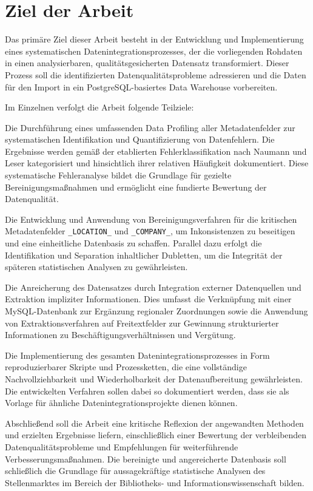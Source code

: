 \documentclass[
    a4paper,
    12pt,
    headinclude=true,
    BCOR=10mm,
]{scrreprt}
\begin{document}
\section{Ziel der Arbeit}

Das primäre Ziel dieser Arbeit besteht in der Entwicklung und Implementierung eines systematischen Datenintegrationsprozesses, der die vorliegenden Rohdaten in einen analysierbaren, qualitätsgesicherten Datensatz transformiert. Dieser Prozess soll die identifizierten Datenqualitätsprobleme adressieren und die Daten für den Import in ein PostgreSQL-basiertes Data Warehouse vorbereiten.

Im Einzelnen verfolgt die Arbeit folgende Teilziele:

Die Durchführung eines umfassenden Data Profiling aller Metadatenfelder zur systematischen Identifikation und Quantifizierung von Datenfehlern. Die Ergebnisse werden gemäß der etablierten Fehlerklassifikation nach Naumann und Leser kategorisiert und hinsichtlich ihrer relativen Häufigkeit dokumentiert. Diese systematische Fehleranalyse bildet die Grundlage für gezielte Bereinigungsmaßnahmen und ermöglicht eine fundierte Bewertung der Datenqualität.

Die Entwicklung und Anwendung von Bereinigungsverfahren für die kritischen Metadatenfelder \texttt{\_LOCATION\_} und \texttt{\_COMPANY\_}, um Inkonsistenzen zu beseitigen und eine einheitliche Datenbasis zu schaffen. Parallel dazu erfolgt die Identifikation und Separation inhaltlicher Dubletten, um die Integrität der späteren statistischen Analysen zu gewährleisten.

Die Anreicherung des Datensatzes durch Integration externer Datenquellen und Extraktion impliziter Informationen. Dies umfasst die Verknüpfung mit einer MySQL-Datenbank zur Ergänzung regionaler Zuordnungen sowie die Anwendung von Extraktionsverfahren auf Freitextfelder zur Gewinnung strukturierter Informationen zu Beschäftigungsverhältnissen und Vergütung.

Die Implementierung des gesamten Datenintegrationsprozesses in Form reproduzierbarer Skripte und Prozessketten, die eine vollständige Nachvollziehbarkeit und Wiederholbarkeit der Datenaufbereitung gewährleisten. Die entwickelten Verfahren sollen dabei so dokumentiert werden, dass sie als Vorlage für ähnliche Datenintegrationsprojekte dienen können.

Abschließend soll die Arbeit eine kritische Reflexion der angewandten Methoden und erzielten Ergebnisse liefern, einschließlich einer Bewertung der verbleibenden Datenqualitätsprobleme und Empfehlungen für weiterführende Verbesserungsmaßnahmen. Die bereinigte und angereicherte Datenbasis soll schließlich die Grundlage für aussagekräftige statistische Analysen des Stellenmarktes im Bereich der Bibliotheks- und Informationswissenschaft bilden.
\end{document}
